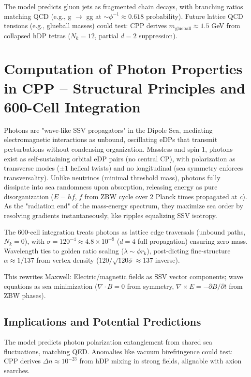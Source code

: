 \documentclass{article}
\begin{document}
The model predicts gluon jets as fragmented chain decays, with branching ratios matching QCD (e.g., g $\to$ gg at $\sim\phi^{-1} \approx 0.618$ probability). Future lattice QCD tensions (e.g., glueball masses) could test: CPP derives $m_{\text{glueball}} \approx 1.5$ GeV from collapsed hDP tetras ($N_k=12$, partial $d=2$ suppression).

\section{Computation of Photon Properties in CPP -- Structural Principles and 600-Cell Integration}

Photons are "wave-like SSV propagators" in the Dipole Sea, mediating electromagnetic interactions as unbound, oscillating eDPs that transmit perturbations without condensing organization. Massless and spin-1, photons exist as self-sustaining orbital eDP pairs (no central CP), with polarization as transverse modes ($\pm1$ helical twists) and no longitudinal (sea symmetry enforces transversality). Unlike neutrinos (minimal threshold mass), photons fully dissipate into sea randomness upon absorption, releasing energy as pure disorganization ($E = h f$, $f$ from ZBW cycle over 2 Planck times propagated at $c$). As the "radiation end" of the mass-energy spectrum, they maximize sea order by resolving gradients instantaneously, like ripples equalizing SSV isotropy.

The 600-cell integration treats photons as lattice edge traversals (unbound paths, $N_k=0$), with $\sigma=120^{-4} \approx 4.8 \times 10^{-9}$ ($d=4$ full propagation) ensuring zero mass. Wavelength ties to golden ratio scaling ($\lambda \sim \phi r_k$), post-dicting fine-structure $\alpha \approx 1/137$ from vertex density ($120/\sqrt{120 \phi} \approx 137$ inverse).

This rewrites Maxwell: Electric/magnetic fields as SSV vector components; wave equations as sea minimization ($\nabla\cdot B=0$ from symmetry, $\nabla\times E = -\partial B/\partial t$ from ZBW phases).

\subsection{Implications and Potential Predictions}

The model predicts photon polarization entanglement from shared sea fluctuations, matching QED. Anomalies like vacuum birefringence could test: CPP derives $\Delta n \approx 10^{-23}$ from hDP mixing in strong fields, alignable with axion searches.
\end{document}
